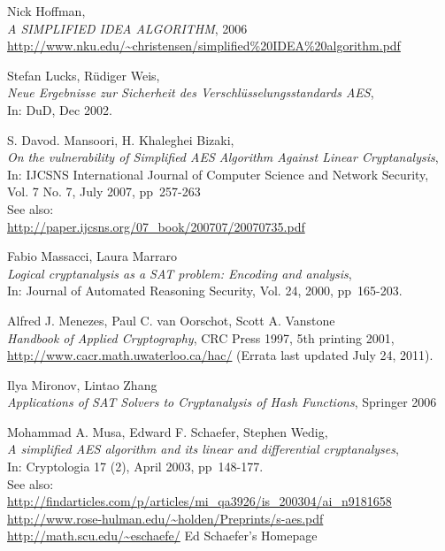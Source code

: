 \begin{thebibliography}{99999}
  
       Nick Hoffman, \\
       {\em A SIMPLIFIED IDEA ALGORITHM},
       2006 \\
       \url{http://www.nku.edu/~christensen/simplified%20IDEA%20algorithm.pdf}

  
       Stefan Lucks, R\"udiger Weis, \\
       {\em Neue Ergebnisse zur Sicherheit des Verschl\"usselungsstandards AES},\\
       In: DuD, Dec 2002.

  
       S. Davod. Mansoori, H. Khaleghei Bizaki, \\
       {\em On the vulnerability of Simplified AES Algorithm Against Linear
       Cryptanalysis}, \\
       In: IJCSNS International Journal of Computer Science and Network
       Security, Vol. 7 No. 7, July 2007, pp~257-263 \\
       See also:\\
       \url{http://paper.ijcsns.org/07_book/200707/20070735.pdf}

 
       Fabio Massacci, Laura Marraro \\
       {\em Logical cryptanalysis as a SAT problem: Encoding and analysis},\\ 
       In: Journal of Automated Reasoning Security,
       Vol. 24, 2000, pp~165-203.

 
       Alfred J. Menezes, Paul C. van Oorschot, Scott A. Vanstone \\
       {\em Handbook of Applied Cryptography}, 
       CRC Press 1997, 5th printing 2001,\\
       \url{http://www.cacr.math.uwaterloo.ca/hac/} (Errata last updated July 24, 2011).

 
       Ilya Mironov, Lintao Zhang \\
       {\em Applications of SAT Solvers to Cryptanalysis of Hash Functions}, 
       Springer 2006

  
       Mohammad A. Musa, Edward F. Schaefer, Stephen Wedig, \\
       {\em A simplified AES algorithm and its linear and differential cryptanalyses}, \\
       In: Cryptologia 17 (2), April 2003, pp~148-177.\\
       See also:\\
       \url{http://findarticles.com/p/articles/mi_qa3926/is_200304/ai_n9181658}\\
       \url{http://www.rose-hulman.edu/~holden/Preprints/s-aes.pdf}\\
       \url{http://math.scu.edu/~eschaefe/}   Ed Schaefer's Homepage


\end{thebibliography}

